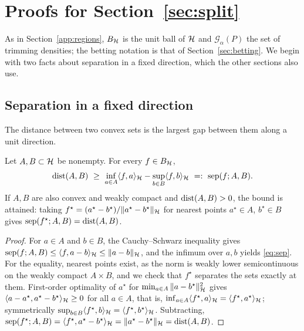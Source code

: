\section{Proofs for Section~\ref{sec:split}}
\label{app:split}

As in Section~\ref{app:regions}, $B_{\mathcal{H}}$ is the unit ball of $\mathcal{H}$ and $\mathcal G_\alpha(P)$ the set of
trimming densities; the betting notation is that of Section~\ref{sec:betting}. We begin with two facts about separation in a fixed direction, which the other sections also use.

\subsection{Separation in a fixed direction}

The distance between two convex sets is the largest gap between them along a unit direction.

\begin{lemma}
\label{lem:separation}
Let $A,B\subset\mathcal{H}$ be nonempty. For every $f\in B_{\mathcal{H}}$,
\begin{equation}
\dist(A,B)\ \ge\ \inf_{a\in A}\langle f,a\rangle_\Hh-\sup_{b\in B}\langle f,b\rangle_\Hh\ =:\ \mathrm{sep}(f;A,B).
\label{eq:sep}
\end{equation}
If $A,B$ are also convex and weakly compact and $\operatorname{dist}(A,B)>0$, the bound is attained: taking
$f^\star=(a^\star-b^\star)/\|a^\star-b^\star\|_{\mathcal{H}}$ for nearest points $a^\star\in A$, $b^\star\in B$ gives
$\mathrm{sep}(f^\star;A,B)=\operatorname{dist}(A,B)$.
\end{lemma}

\begin{proof}
For $a\in A$ and $b\in B$, the Cauchy--Schwarz inequality gives
$\mathrm{sep}(f;A,B)\le\langle f,a-b\rangle_{\mathcal{H}}\le\|a-b\|_{\mathcal{H}}$, and the infimum over $a,b$ yields \eqref{eq:sep}. For
the equality, nearest points exist, as the norm is weakly lower semicontinuous on the weakly compact $A\times B$, and
we check that $f^\star$ separates the sets exactly at them. First-order optimality of $a^\star$ for
$\min_{a\in A}\|a-b^\star\|_{\mathcal{H}}^2$ gives $\langle a-a^\star,a^\star-b^\star\rangle_{\mathcal{H}}\ge0$ for all $a\in A$, that is,
$\inf_{a\in A}\langle f^\star,a\rangle_{\mathcal{H}}=\langle f^\star,a^\star\rangle_{\mathcal{H}}$; symmetrically
$\sup_{b\in B}\langle f^\star,b\rangle_{\mathcal{H}}=\langle f^\star,b^\star\rangle_{\mathcal{H}}$. Subtracting,
$\mathrm{sep}(f^\star;A,B)=\langle f^\star,a^\star-b^\star\rangle_{\mathcal{H}}=\|a^\star-b^\star\|_{\mathcal{H}}=\operatorname{dist}(A,B)$.
\end{proof}

